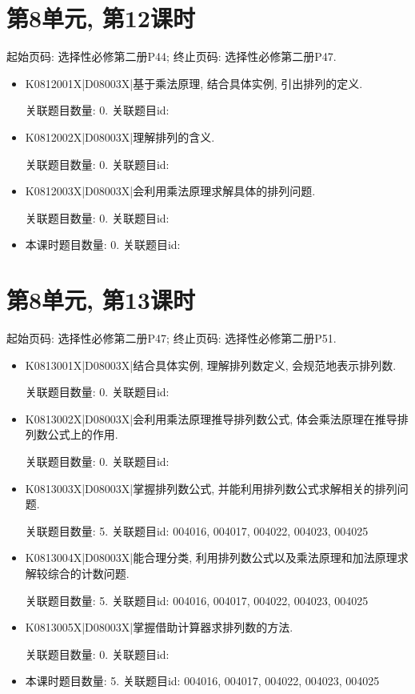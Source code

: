 \section*{第8单元, 第12课时}
起始页码: 选择性必修第二册P44; 终止页码: 选择性必修第二册P47.
\begin{itemize}
\item K0812001X|D08003X|基于乘法原理, 结合具体实例, 引出排列的定义.

关联题目数量: 0. 关联题目id: 

\item K0812002X|D08003X|理解排列的含义.

关联题目数量: 0. 关联题目id: 

\item K0812003X|D08003X|会利用乘法原理求解具体的排列问题.

关联题目数量: 0. 关联题目id: 

\item 本课时题目数量: 0. 关联题目id: 

\end{itemize}

\section*{第8单元, 第13课时}
起始页码: 选择性必修第二册P47; 终止页码: 选择性必修第二册P51.
\begin{itemize}
\item K0813001X|D08003X|结合具体实例, 理解排列数定义, 会规范地表示排列数.

关联题目数量: 0. 关联题目id: 

\item K0813002X|D08003X|会利用乘法原理推导排列数公式, 体会乘法原理在推导排列数公式上的作用.

关联题目数量: 0. 关联题目id: 

\item K0813003X|D08003X|掌握排列数公式, 并能利用排列数公式求解相关的排列问题.

关联题目数量: 5. 关联题目id: 004016, 004017, 004022, 004023, 004025

\item K0813004X|D08003X|能合理分类, 利用排列数公式以及乘法原理和加法原理求解较综合的计数问题.

关联题目数量: 5. 关联题目id: 004016, 004017, 004022, 004023, 004025

\item K0813005X|D08003X|掌握借助计算器求排列数的方法.

关联题目数量: 0. 关联题目id: 

\item 本课时题目数量: 5. 关联题目id: 004016, 004017, 004022, 004023, 004025

\end{itemize}

